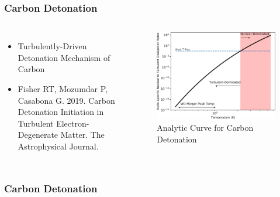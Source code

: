 \documentclass{beamer}
\begin{document}
\begin{frame}
\frametitle{Carbon Detonation}

\begin{columns}[c]
        \begin{itemize}
                \item Turbulently-Driven Detonation Mechanism of Carbon
                \item Fisher RT, Mozumdar P, Casabona G. 2019. Carbon Detonation Initiation in Turbulent Electron-Degenerate Matter. The Astrophysical Journal.
        \end{itemize}


	\vspace{25pt}
        \begin{figure}
    \begin{center}
      \includegraphics[width=.90\linewidth]{carbon_enuc_ration.png}
            \caption{Analytic Curve for Carbon Detonation}
    \end{center}
  \end{figure}

        \end{columns}

\end{frame}


\begin{frame}
\frametitle{Carbon Detonation}

        \begin{figure}
    \begin{center}
    \end{center}
  \end{figure}


\end{frame}
\end{document}
